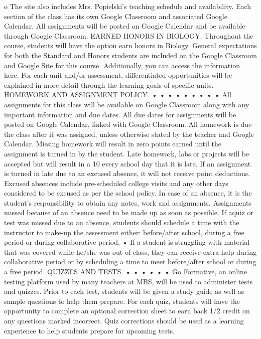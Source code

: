 o The site also includes Mrs. Popielski’s teaching schedule and availability.
Each section of the class has its own Google Classroom and associated Google Calendar.
All assignments will be posted on Google Calendar and be available through Google
Classroom.
EARNED HONORS IN BIOLOGY.
Throughout the course, students will have the option earn honors in Biology. General
expectations for both the Standard and Honors students are included on the Google Classroom
and Google Site for this course. Additionally, you can access the information here. For each unit
and/or assessment, differentiated opportunities will be explained in more detail through the
learning goals of specific units.
HOMEWORK AND ASSIGNMENT POLICY.
•
•
•
•
•
•
•
•
•
All assignments for this class will be available on Google Classroom along with any
important information and due dates.
All due dates for assignments will be posted on Google Calendar, linked with Google
Classroom.
All homework is due the class after it was assigned, unless otherwise stated by the teacher
and Google Calendar.
Missing homework will result in zero points earned until the assignment is turned in by the
student.
Late homework, labs or projects will be accepted but will result in a 10%
every school day that it is late.
If an assignment is turned in late due to an excused absence, it will not receive point
deductions.
Excused absences include pre-scheduled college visits and any other days considered to be
excused as per the school policy.
In case of an absence, it is the student’s responsibility to obtain any notes, work and
assignments.
Assignments missed because of an absence need to be made up as soon as possible. If aquiz or test was missed due to an absence, students should schedule a time with the
instructor to make-up the assessment either: before/after school, during a free period or
during collaborative period.
• If a student is struggling with material that was covered while he/she was out of class, they
can receive extra help during collaborative period or by scheduling a time to meet
before/after school or during a free period.
QUIZZES AND TESTS.
•
•
•
•
•
•
Go Formative, an online testing platform used by many teachers at MBS, will be used to
administer tests and quizzes.
Prior to each test, students will be given a study guide as well as sample questions to help
them prepare.
For each quiz, students will have the opportunity to complete an optional correction sheet to
earn back 1/2 credit on any questions marked incorrect. Quiz corrections should be used as
a learning experience to help students prepare for upcoming tests.
